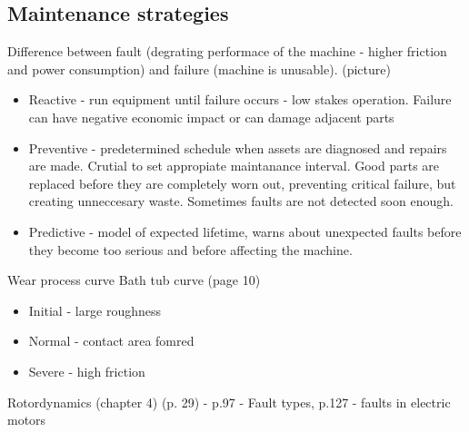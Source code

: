 \subsection{Maintenance strategies}
Difference between fault (degrating performace of the machine - higher friction and power consumption) and failure (machine is unusable). \cite{mohanty_machinery_2015} (picture)
\begin{itemize}
\item Reactive - run equipment until failure occurs - low stakes operation. Failure can have negative economic impact or can damage adjacent parts
\item Preventive - predetermined schedule when assets are diagnosed and repairs are made. Crutial to set appropiate maintanance interval. Good parts are replaced before they are completely worn out, preventing critical failure, but creating unneccesary waste. Sometimes faults are not detected soon enough.
\item Predictive - model of expected lifetime, warns about unexpected faults before they become too serious and before affecting the machine.
\end{itemize}

Wear process curve \cite{mohanty_machinery_2015} Bath tub curve (page 10)
\begin{itemize}
	\item Initial - large roughness
	\item Normal - contact area fomred
	\item Severe - high friction
\end{itemize}

Rotordynamics (chapter 4) (p. 29)  - p.97 - Fault types, p.127 - faults in electric motors

